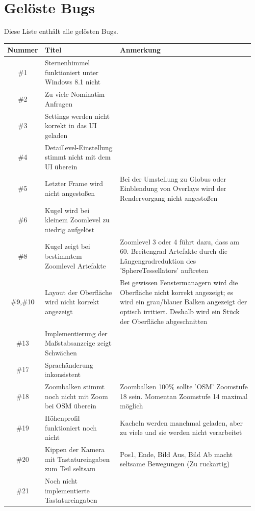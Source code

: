 \documentclass[10pt]{scrreprt}
\begin{document}
\vspace{15mm}

\section{Gelöste Bugs}
Diese Liste enthält alle gelösten Bugs.
\begin{longtable}{|c|p{5.2cm}|p{8.2cm}|}
\hline
Nummer & Titel & Anmerkung \\
\hline
\hline
\#1 & Sternenhimmel funktioniert unter Windows 8.1 nicht & \\
\hline
\#2 & Zu viele Nominatim-Anfragen &  \\
\hline
\#3 & Settings werden nicht korrekt in das UI geladen & \\
\hline
\#4 & Detaillevel-Einstellung stimmt nicht mit dem UI überein &  \\
\hline
\#5 & Letzter Frame wird nicht angestoßen & Bei der Umstellung zu Globus oder Einblendung von Overlays wird der Rendervorgang nicht angestoßen \\
\hline
\#6 & Kugel wird bei kleinem Zoomlevel zu niedrig aufgelöst & \\
\hline
\#8 & Kugel zeigt bei bestimmtem Zoomlevel Artefakte & Zoomlevel 3 oder 4 führt dazu, dass am 60. Breitengrad Artefakte durch die Längengradreduktion des 'SphereTessellators' auftreten \\
\hline
\#9,\#10 & Layout der Oberfläche wird nicht korrekt angezeigt & Bei gewissen Fenstermanagern wird die Oberfläche nicht korrekt angezeigt; es wird ein grau/blauer Balken angezeigt der optisch irritiert. Deshalb wird ein Stück der Oberfläche abgeschnitten \\
\hline
\#13 & Implementierung der Maßstabsanzeige zeigt Schwächen & \\
\hline
\#17 & Sprachänderung inkonsistent & \\
\hline
\#18 & Zoombalken stimmt noch nicht mit Zoom bei OSM überein & Zoombalken 100\% sollte 'OSM' Zoomstufe 18 sein. Momentan Zoomstufe 14 maximal möglich\\
\hline
\#19 & Höhenprofil funktioniert noch nicht & Kacheln werden manchmal geladen, aber zu viele und sie werden nicht verarbeitet \\
\hline
\#20 & Kippen der Kamera mit Tastatureingaben zum Teil seltsam & Pos1, Ende, Bild Aus, Bild Ab macht seltsame Bewegungen (Zu ruckartig) \\
\hline
\#21 & Noch nicht implementierte Tastatureingaben & \\

\end{longtable}
\end{document}
